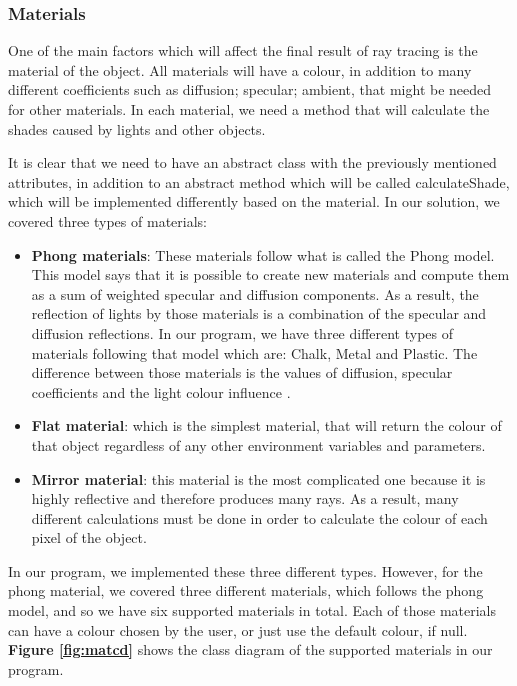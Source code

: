 \documentclass[a4paper]{report}
\begin{document}
	\subsubsection{Materials}
	\label{sssec:mat}One of the main factors which will affect the final result of ray tracing is the material of the object. All materials will have a colour, in addition to many different coefficients such as diffusion; specular; ambient, that might be needed for other materials. In each material, we need a method that will calculate the shades caused by lights and other objects. \newline
	\par It is clear that we need to have an abstract class with the previously mentioned attributes, in addition to an abstract method which will be called calculateShade, which will be implemented differently based on the material. In our solution, we covered three types of materials:
	\begin{itemize}
		\item \textbf{Phong materials}:  These materials follow what is called the Phong model. This model says that it is possible to create new materials and compute them as a sum of weighted specular and diffusion components. As a result, the reflection of lights by those materials is a combination of the specular and diffusion reflections. In our program, we have three different types of materials following that model which are: Chalk, Metal and Plastic. The difference between those materials is the values of diffusion, specular coefficients and the light colour influence \cite{scratchapixel_phong_2015}.
		\item \textbf{Flat material}: which is the simplest material, that will return the colour of that object regardless of any other environment variables and parameters.
		\item \textbf {Mirror material}: this material is the most complicated one because it is highly reflective and therefore produces many rays. As a result, many different calculations must be done in order to calculate the colour of each pixel of the object.
	\end{itemize}
	In our program, we implemented these three different types. However, for the phong material, we covered three different materials, which follows the phong model, and so we have six supported materials in total. Each of those materials can have a colour chosen by the user, or just use the default colour, if null. \textbf{Figure \ref{fig:matcd}} shows the class diagram of the supported materials in our program.
\end{document}
